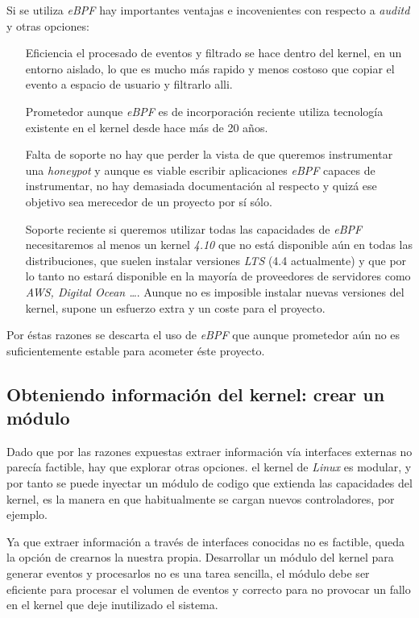 Si se utiliza \emph{eBPF} hay importantes ventajas e incovenientes con respecto a \emph{auditd} y otras opciones:
\begin{enumerate}
    \item[Eficiencia] el procesado de eventos y filtrado se hace dentro del kernel, en un entorno aislado, lo que es mucho más
    rapido y menos costoso que copiar el evento a espacio de usuario y filtrarlo alli.
    \item[Prometedor] aunque \emph{eBPF} es de incorporación reciente utiliza tecnología existente en el kernel desde hace más de 20 años.
    \item[Falta de soporte] no hay que perder la vista de que queremos instrumentar una \emph{honeypot} y aunque es viable escribir aplicaciones \emph{eBPF} capaces de instrumentar, no hay demasiada documentación al respecto
    y quizá ese objetivo sea merecedor de un proyecto por sí sólo.
    \item[Soporte reciente] si queremos utilizar todas las capacidades de \emph{eBPF} necesitaremos al menos un kernel \emph{4.10} que no está disponible aún en todas las distribuciones, que suelen instalar
    versiones \emph{LTS} (4.4 actualmente) y que por lo tanto no estará disponible en la mayoría de proveedores de servidores como \emph{AWS, Digital Ocean \ldots}. Aunque no es imposible instalar nuevas versiones del kernel,
    supone un esfuerzo extra y un coste para el proyecto.
\end{enumerate}

Por éstas razones se descarta el uso de \emph{eBPF} que aunque prometedor aún no es suficientemente estable para acometer éste proyecto.
\clearpage

\subsection{Obteniendo información del kernel: crear un módulo}

Dado que por las razones expuestas extraer información vía interfaces externas no parecía factible, hay que explorar otras opciones.
el kernel de \emph{Linux} es modular, y por tanto se puede inyectar un módulo de codigo que extienda las capacidades del kernel, es la manera
en que habitualmente se cargan nuevos controladores, por ejemplo.

Ya que extraer información a través de interfaces conocidas no es factible, queda la opción de crearnos la nuestra propia. 
Desarrollar un módulo del kernel para generar eventos y procesarlos no es una tarea sencilla, el módulo debe ser eficiente para procesar el volumen
de eventos y correcto para no provocar un fallo en el kernel que deje inutilizado el sistema.

